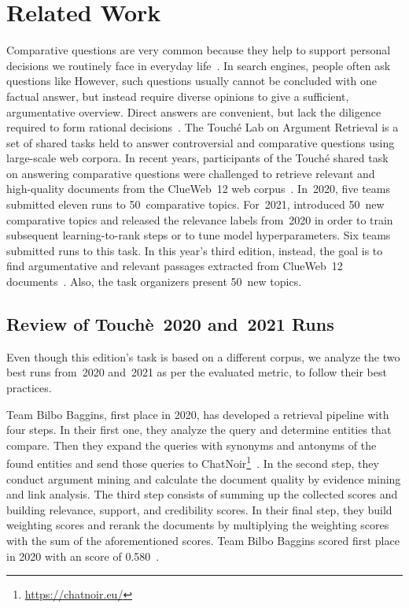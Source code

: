 \section{Related Work}

Comparative questions are very common because they help to support personal decisions we routinely face in everyday life~\cite{BondarenkoFBGAPBSWPH2020,BondarenkoGFBAPBSWPH2021}.
In search engines, people often ask questions like 
However, such questions usually cannot be concluded with one factual answer, but instead require diverse opinions to give a sufficient, argumentative overview.
Direct answers are convenient, but lack the diligence required to form rational decisions~\cite{BondarenkoFBGAPBSWPH2020,PotthastHS2020}.
The Touché Lab on Argument Retrieval is a set of shared tasks held to answer controversial and comparative questions using large-scale web corpora.
In recent years, participants of the Touché shared task on answering comparative questions were challenged to retrieve relevant and high-quality documents from the ClueWeb~12 web corpus~\cite{BondarenkoFBGAPBSWPH2020,BondarenkoGFBAPBSWPH2021}.
In~2020, five teams submitted eleven runs to 50~comparative topics.
For~2021, \citeauthor{BondarenkoGFBAPBSWPH2021} introduced 50~new comparative topics and released the relevance labels from~2020 in order to train subsequent learning-to-rank steps or to tune model hyperparameters.
Six teams submitted runs to this task.
In this year's third edition, instead, the goal is to find argumentative and relevant passages extracted from ClueWeb~12 documents~\todocite.
Also, the task organizers present 50~new topics.

\subsection{Review of Touchè~2020 and~2021 Runs}

Even though this edition's task is based on a different corpus, we analyze the two best runs from~2020 and~2021 as per the evaluated  metric, to follow their best practices.

Team Bilbo Baggins, first place in 2020, has developed a retrieval pipeline with four steps.
In their first one, they analyze the query and determine entities that compare.
Then they expand the queries with synonyms and antonyms of the found entities and send those queries to ChatNoir\footnote{\url{https://chatnoir.eu/}}~\cite{BevendorffSHP2018}.
In the second step, they conduct argument mining and calculate the document quality by evidence mining and link analysis.
The third step consists of summing up the collected scores and building relevance, support, and credibility scores.
In their final step, they build weighting scores and rerank the documents by multiplying the weighting scores with the sum of the aforementioned scores.
Team Bilbo Baggins scored first place in 2020 with an  score of 0.580~\cite{AbyeST2020}.

